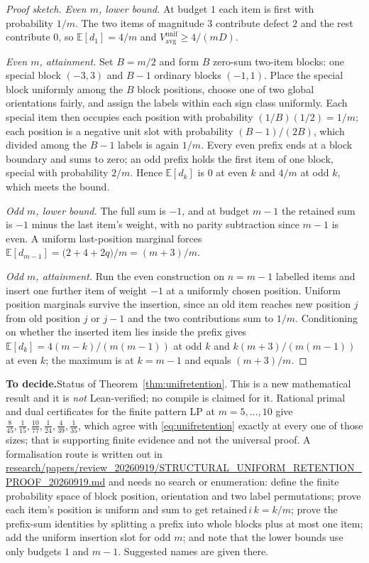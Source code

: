 \documentclass[conference]{IEEEtran}
\theoremstyle{definition}
\newif\ifshownotes\shownotestrue
\newcommand{\TODOPAR}[1]{\ifshownotes\par\vspace{2pt}\noindent%
  {\color{todocol}\textsf{\footnotesize\textbf{To decide.}\;#1}}\par\vspace{2pt}\fi}
\begin{document}
\begin{proof}[Proof sketch]
\emph{Even $m$, lower bound.} At budget $1$ each item is first with probability $1/m$. The two
items of magnitude $3$ contribute defect $2$ and the rest contribute $0$, so
$\mathbb{E}[d_{1}]=4/m$ and $V^{\mathrm{unif}}_{\mathrm{avg}}\ge4/(mD)$.

\emph{Even $m$, attainment.} Set $B=m/2$ and form $B$ zero-sum two-item blocks: one special
block $(-3,3)$ and $B-1$ ordinary blocks $(-1,1)$. Place the special block uniformly among the
$B$ block positions, choose one of two global orientations fairly, and assign the labels
within each sign class uniformly. Each special item then occupies each position with
probability $(1/B)(1/2)=1/m$; each position is a negative unit slot with probability
$(B-1)/(2B)$, which divided among the $B-1$ labels is again $1/m$. Every even prefix ends at a
block boundary and sums to zero; an odd prefix holds the first item of one block, special with
probability $2/m$. Hence $\mathbb{E}[d_{k}]$ is $0$ at even $k$ and $4/m$ at odd $k$, which
meets the bound.

\emph{Odd $m$, lower bound.} The full sum is $-1$, and at budget $m-1$ the retained sum is
$-1$ minus the last item's weight, with no parity subtraction since $m-1$ is even. A uniform
last-position marginal forces
$\mathbb{E}[d_{m-1}]=\bigl(2+4+2q\bigr)/m=(m+3)/m$.

\emph{Odd $m$, attainment.} Run the even construction on $n=m-1$ labelled items and insert one
further item of weight $-1$ at a uniformly chosen position. Uniform position marginals survive
the insertion, since an old item reaches new position $j$ from old position $j$ or $j-1$ and
the two contributions sum to $1/m$. Conditioning on whether the inserted item lies inside the
prefix gives $\mathbb{E}[d_{k}]=4(m-k)/(m(m-1))$ at odd $k$ and $k(m+3)/(m(m-1))$ at even $k$;
the maximum is at $k=m-1$ and equals $(m+3)/m$.
\end{proof}

\TODOPAR{Status of Theorem~\ref{thm:unifretention}. This is a new mathematical result and it
is \emph{not} Lean-verified; no compile is claimed for it. Rational primal and dual
certificates for the finite pattern LP at $m=5,\dots,10$ give
$\tfrac{8}{45},\tfrac1{15},\tfrac{10}{77},\tfrac1{24},\tfrac4{39},\tfrac1{35}$, which agree
with \eqref{eq:unifretention} exactly at every one of those sizes; that is supporting finite
evidence and not the universal proof. A formalisation route is written out in
\url{research/papers/review_20260919/STRUCTURAL_UNIFORM_RETENTION_PROOF_20260919.md}
and needs no search or enumeration: define the finite probability space of block position,
orientation and two label permutations; prove each item's position is uniform and sum to get
$\mathrm{retained}\,i\,k=k/m$; prove the prefix-sum identities by splitting a prefix into whole
blocks plus at most one item; add the uniform insertion slot for odd $m$; and note that the
lower bounds use only budgets $1$ and $m-1$. Suggested names are given there.}
\end{document}
